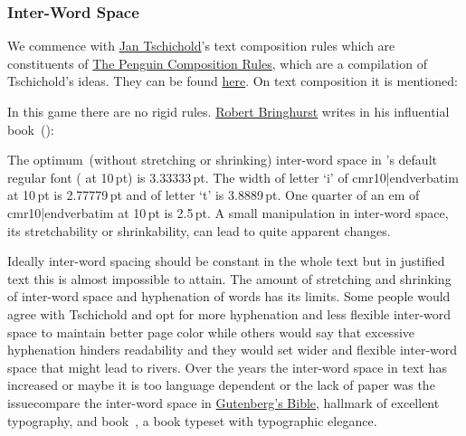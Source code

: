 {{\subsubsection{Inter-Word Space}
We commence with \href{http://www.linotype.com/794/inhonorofthe100thbirthdayofjantschichold.html}{Jan Tschichold}'s text composition rules which are constituents of \href{http://openlibrary.org/books/OL19449256M/Penguin_composition_rules.}{The Penguin Composition Rules}, which are a compilation of Tschichold's ideas. They can be found \href{http://ronin-group.org/misc_etext_tschichold.html}{here}. On text composition it is mentioned:

\ii In this game there are no rigid rules. \href{http://www.typotheque.com/authors/robert_bringhurst}{Robert Bringhurst} writes in his influential book~(\cite{elements_typographic}):

\ii The optimum~(without stretching or shrinking) inter-word space in \capstex's default regular font ( at 10\,pt) is 3.33333\,pt. The width of letter `i' of {\verbatim cmr10|endverbatim} at 10\,pt is 2.77779\,pt and of letter `t' is 3.8889\,pt. One quarter of an em of {\verbatim cmr10|endverbatim} at 10\,pt is 2.5\,pt. A small manipulation in inter-word space, its stretchability or shrinkability, can lead to quite apparent changes.


Ideally inter-word spacing should be constant in the whole text but in justified text this is almost impossible to attain. The amount of stretching and shrinking of inter-word space and hyphenation of words has its limits. Some people would agree with Tschichold and opt for more hyphenation and less flexible inter-word space to maintain better page color while others would say that excessive hyphenation hinders readability and they would set wider and flexible inter-word space that might lead to rivers. Over the years the inter-word space in text has increased or maybe it is too language dependent or the lack of paper was the issue\emdash compare the inter-word space in \href{http://burton.byu.edu/Bible\%20Site/Gutenberg.htm}{Gutenberg's Bible}, hallmark of excellent typography, and book~\cite{knuth_texbook}, a book typeset with typo\-gra\-phic elegance.

}}
